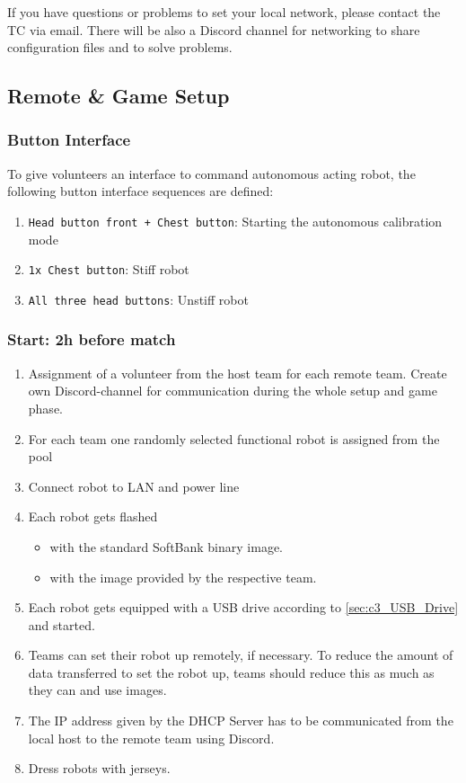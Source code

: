 If you have questions or problems to set your local network, please contact the TC via email. There will be also a Discord channel for networking to share configuration files and to solve problems.

\subsection{Remote \& Game Setup}
\label{sec:remote_game_setup}
\subsubsection{Button Interface}
To give volunteers an interface to command autonomous acting robot, the following button interface sequences are defined:
\begin{enumerate}
	\item \texttt{Head button front + Chest button}: Starting the autonomous calibration mode
	\item \texttt{1x Chest button}: Stiff robot
	\item \texttt{All three head buttons}: Unstiff robot
\end{enumerate} 

\subsubsection{Start: 2h before match}

    \begin{enumerate}
        \item Assignment of a volunteer from the host team for each remote team. Create own Discord-channel for communication during the whole setup and game phase.
		\item For each team one randomly selected functional robot is assigned from the pool
        \item Connect robot to LAN and power line
        \item Each robot gets flashed 
        \begin{itemize}
            \item with the standard SoftBank binary image.
            \item with the image provided by the respective team.
		\end{itemize}
		\item Each robot gets equipped with a USB drive according to \ref{sec:c3_USB_Drive} and started.
        \item Teams can set their robot up remotely, if necessary. To reduce the amount of data transferred to set the robot up, teams should reduce this as much as they can and use images.
        \item The IP address given by the DHCP Server has to be communicated from the local host to the remote team using Discord.
        \item Dress robots with jerseys.
    \end{enumerate}

